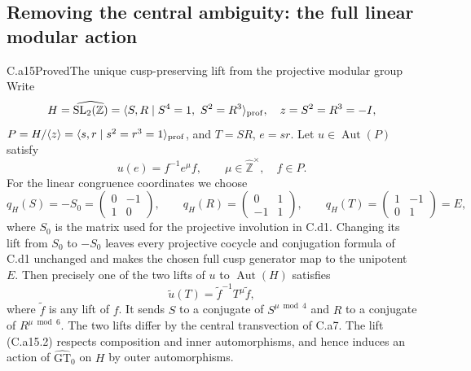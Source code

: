 \subsection{Removing the central ambiguity: the full linear modular action}

\begin{claim}{C.a15}{Proved}{The unique cusp-preserving lift from the projective modular group}
Write
\[
 H=\widehat{\mathrm{SL}_2(\mathbb Z)}
  =\langle S,R\mid S^4=1,\ S^2=R^3\rangle_{\rm prof},\quad
 z=S^2=R^3=-I,
\]
$P=H/\langle z\rangle=\langle s,r\mid s^2=r^3=1\rangle_{\rm prof}$,
and $T=SR$, $e=sr$. Let $u\in\operatorname{Aut}(P)$ satisfy
\[
 u(e)=f^{-1}e^\mu f,\qquad\mu\in\widehat{\mathbb Z}^{\times},\quad f\in P.
 \tag{C.a15.1}
\]
For the linear congruence coordinates we choose
\[
 q_H(S)=-S_0=\begin{pmatrix}0&-1\\1&0\end{pmatrix},\qquad
 q_H(R)=\begin{pmatrix}0&1\\-1&1\end{pmatrix},\qquad
 q_H(T)=\begin{pmatrix}1&-1\\0&1\end{pmatrix}=E,
\]
where $S_0$ is the matrix used for the projective involution in C.d1.
Changing its lift from $S_0$ to $-S_0$ leaves every projective
cocycle and conjugation formula of C.d1 unchanged and makes the
chosen full cusp generator map to the unipotent $E$.
Then precisely one of the two lifts of $u$ to $\operatorname{Aut}(H)$
satisfies
\[
 \widetilde u(T)=\widetilde f^{-1}T^\mu\widetilde f,
 \tag{C.a15.2}
\]
where $\widetilde f$ is any lift of $f$. It sends $S$ to a conjugate
of $S^{\mu\bmod4}$ and $R$ to a conjugate of $R^{\mu\bmod6}$.
The two lifts differ by the central transvection of C.a7. The lift
(C.a15.2) respects composition and inner automorphisms, and hence induces
an action of $\widehat{\mathrm{GT}}_0$ on $H$ by outer automorphisms.
\end{claim}

